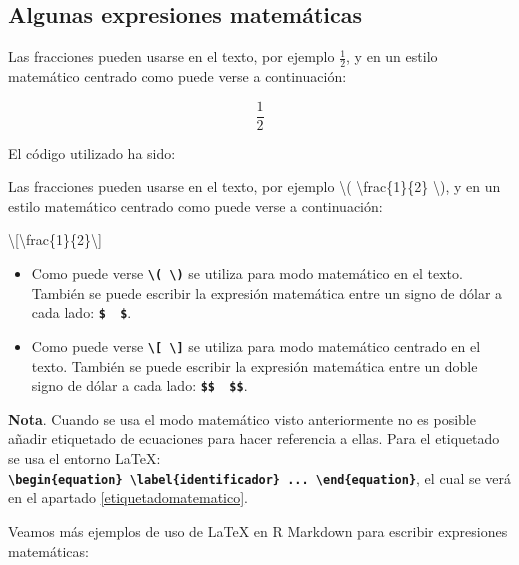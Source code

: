 \documentclass[12pt,a4paper,oneside,]{book}
\newenvironment{Shaded}{\begin{snugshade}}{\end{snugshade}}
\newcommand{\NormalTok}[1]{#1}
\newcommand{\SpecialCharTok}[1]{\textcolor[rgb]{0.00,0.00,0.00}{#1}}
\numberwithin{dummy}{section}
\theoremstyle{ocrenumbox}
\theoremstyle{blacknumex}
\theoremstyle{blacknumbox}
\theoremstyle{ocrenum}
\theoremstyle{ocrenum}
\begin{document}
\hypertarget{algunas-expresiones-matemuxe1ticas}{%
\subsection{Algunas expresiones
matemáticas}\label{algunas-expresiones-matemuxe1ticas}}

Las fracciones pueden usarse en el texto, por ejemplo \(\frac{1}{2}\), y
en un estilo matemático centrado como puede verse a continuación:

\[\frac{1}{2}\]

El código utilizado ha sido:

\begin{Shaded}
\begin{Highlighting}[]
\NormalTok{Las fracciones pueden usarse en el texto, por ejemplo }\SpecialCharTok{\textbackslash{}(}\NormalTok{ \textbackslash{}frac\{1\}\{2\} }\SpecialCharTok{\textbackslash{})}\NormalTok{, }
\NormalTok{y en un estilo matemático centrado como puede verse a continuación:}
 
\SpecialCharTok{\textbackslash{}[}\NormalTok{\textbackslash{}frac\{1\}\{2\}}\SpecialCharTok{\textbackslash{}]}
\end{Highlighting}
\end{Shaded}

\begin{itemize}
\item
  Como puede verse
  \textbf{\texttt{\textbackslash{}(\ \textbackslash{})}} se utiliza para
  modo matemático en el texto. También se puede escribir la expresión
  matemática entre un signo de dólar a cada lado:
  \textbf{\texttt{\$\ \ \$}}.
\item
  Como puede verse
  \textbf{\texttt{\textbackslash{}{[}\ \textbackslash{}{]}}} se utiliza
  para modo matemático centrado en el texto. También se puede escribir
  la expresión matemática entre un doble signo de dólar a cada lado:
  \textbf{\texttt{\$\$\ \ \$\$}}.
\end{itemize}

\textbf{Nota}. Cuando se usa el modo matemático visto anteriormente no
es posible añadir etiquetado de ecuaciones para hacer referencia a
ellas. Para el etiquetado se usa el entorno LaTeX:
\textbf{\texttt{\textbackslash{}begin\{equation\}\ \textbackslash{}label\{identificador\}\ ...\ \textbackslash{}end\{equation\}}},
el cual se verá en el apartado \ref{etiquetadomatematico}.

Veamos más ejemplos de uso de LaTeX en R Markdown para escribir
expresiones matemáticas:
\end{document}

